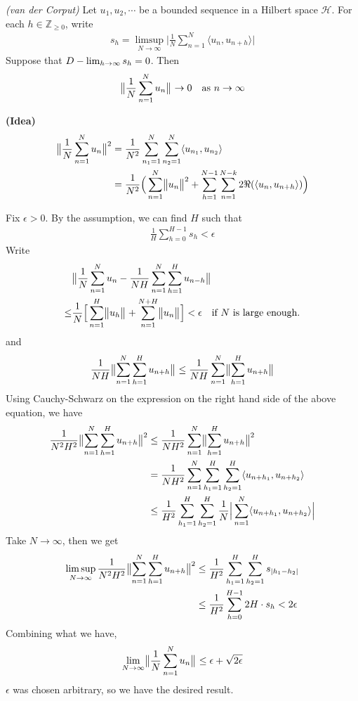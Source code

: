 \documentclass[10pt,a4paper]{report}
\newenvironment{proof}
{\begin{changemargin}{1cm}{0.5cm} 
	}%
	{\end{changemargin}
}
\begin{document}
\lem \emph{(van der Corput)} Let $u_1,u_2,\cdots$ be a bounded sequence in a Hilbert space $\mathscr{H}$. For each $h \in \mathbb{Z}_{\geq 0}$, write
\begin{align*}
s_h = \limsup_{N\rightarrow \infty} \Big| \frac{1}{N} \sum_{n=1}^N \langle u_n, u_{n+h} \rangle \Big|
\end{align*}
Suppose that $D-\lim_{h\rightarrow \infty} s_h =0$. Then
\begin{align*}
\bigl\lVert\frac{1}{N} \sum_{n=1}^N u_n\bigr\rVert_{} \rightarrow 0 \quad \text{as } n\rightarrow \infty
\end{align*}
\begin{proof}
\textbf{(Idea)}
\begin{align*}
\bigl\lVert\frac{1}{N}\sum_{n=1}^N u_n\bigr\rVert_{}^2 &= \frac{1}{N^2} \sum_{n_1=1}^N \sum_{n_2=1}^N \langle u_{n_1}, u_{n_2} \rangle \\
&= \frac{1}{N^2} \Big( \sum_{n=1}^N \bigl\lVert u_n\bigr\rVert_{}^2 + \sum_{h=1}^{N-1} \sum_{n=1}^{N-k} 2 \Re (\langle u_n, u_{n+h} \rangle ) \Big)
\end{align*}
\s

\pf Fix $\epsilon >0$. By the assumption, we can find $H$ such that
\begin{align*}
\frac{1}{H} \sum_{h=0}^{H-1} s_h <\epsilon
\end{align*}
Write
\begin{align*}
& \bigl\lVert\frac{1}{N} \sum_{n=1}^N u_n - \frac{1}{NH} \sum_{n=1}^N \sum_{h=1}^H u_{n-h} \bigr\rVert_{} \\ 
\leq &\frac{1}{N} \Big[ \sum_{n=1}^H \bigl\lVert u_h\bigr\rVert_{} + \sum_{n=1}^{N+H} \bigl\lVert u_n\bigr\rVert_{} \Big] < \epsilon \quad \text{if $N$ is large enough.}
\end{align*}
and
\begin{align*}
\frac{1}{NH} \bigl\lVert\sum_{n=1}^N \sum_{h=1}^H u_{n+h}\bigr\rVert_{} \leq \frac{1}{NH} \sum_{n=1}^N \bigl\lVert\sum_{h=1}^H u_{n+h}\bigr\rVert_{}
\end{align*}
Using Cauchy-Schwarz on the expression on the right hand side of the above equation, we have
\begin{align*}
\frac{1}{N^2 H^2} \bigl\lVert\sum_{n=1}^N \sum_{h=1}^H u_{n+h}\bigr\rVert_{}^2 &\leq \frac{1}{N H^2} \sum_{n=1}^N \bigl\lVert\sum_{h=1}^H u_{n+h}\bigr\rVert_{}^2 \\
& = \frac{1}{NH^2} \sum_{n=1}^N \sum_{h_1=1}^H \sum_{h_2 =1}^H \langle u_{n+h_1}, u_{n+h_2} \rangle \\
& \leq \frac{1}{H^2} \sum_{h_1=1}^H \sum_{h_2 =1}^H \frac{1}{N} \Big| \sum_{n=1}^N \langle u_{n+h_1} , u_{n+h_2} \rangle  \Big|
\end{align*}
Take $N\rightarrow \infty$, then we get
\begin{align*}
\limsup_{N \rightarrow \infty} \frac{1}{N^2 H^2} \bigl\lVert\sum_{n=1}^N \sum_{h=1}^H u_{n+h}\bigr\rVert_{}^2 &\leq \frac{1}{H^2} \sum_{h_1 =1}^H \sum_{h_2=1}^H s_{|h_1 - h_2|} \\
&\leq \frac{1}{H^2} \sum_{h=0}^{H-1} 2H \cdot s_h < 2\epsilon
\end{align*}
Combining what we have,
\begin{align*}
\lim_{N\rightarrow \infty} \bigl\lVert\frac{1}{N} \sum_{n=1}^N u_n\bigr\rVert_{} \leq \epsilon + \sqrt{2\epsilon}
\end{align*}
$\epsilon$ was chosen arbitrary, so we have the desired result.


\end{proof}
\end{document}
